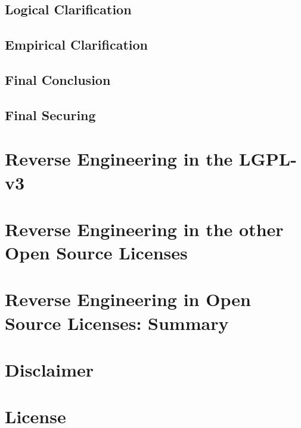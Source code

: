 \documentclass[DIV=calc,BCOR=5mm,12pt,headings=small,oneside,toc=bib]{scrartcl}
\begin{document}
\subsection{Logical Clarification}

\subsection{Empirical Clarification}

\subsection{Final Conclusion}

\subsection{Final Securing}

\section{Reverse Engineering in the LGPL-v3}

\section{Reverse Engineering in the other Open Source Licenses}

\section{Reverse Engineering in Open Source Licenses: Summary}


\label{Disclaimer}
\section{Disclaimer}


\label{License}
\section{License}


\footnotesize

\end{document}
